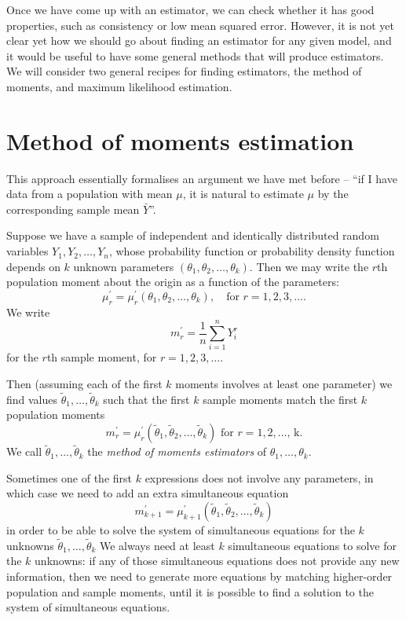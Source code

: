 \documentclass[]{book}
\theoremstyle{definition}
\theoremstyle{definition}
\theoremstyle{definition}
\theoremstyle{remark}
\begin{document}
Once we have come up with an estimator, we can check whether it has good
properties, such as consistency or low mean squared error. However, it
is not yet clear yet how we should go about finding an estimator for any
given model, and it would be useful to have some general methods that
will produce estimators. We will consider two general recipes for
finding estimators, the method of moments, and maximum likelihood
estimation.

\section{Method of moments
estimation}\label{method-of-moments-estimation}

This approach essentially formalises an argument we have met before --
``if I have data from a population with mean \(\mu\), it is natural to
estimate \(\mu\) by the corresponding sample mean \(\bar Y\)''.

Suppose we have a sample of independent and identically distributed
random variables \(Y_1, Y_2, \ldots,Y_n\), whose probability function or
probability density function depends on \(k\) unknown parameters
\((\theta_1, \theta_2, \ldots, \theta_k)\). Then we may write the
\(r\)th population moment about the origin as a function of the
parameters:
\[\mu_r^\prime = \mu_r^\prime(\theta_1, \theta_2, \ldots, \theta_k), \quad \text{for $r = 1, 2, 3, \ldots$.}\]
We write \[m_r^\prime = \frac{1}{n} \sum_{i=1}^n Y_i^r\] for the \(r\)th
sample moment, for \(r = 1, 2, 3, \ldots\).

Then (assuming each of the first \(k\) moments involves at least one
parameter) we find values \(\tilde \theta_1, \ldots, \tilde \theta_k\)
such that the first \(k\) sample moments match the first \(k\)
population moments
\[m_r^\prime = \mu_r^\prime(\tilde \theta_1, \tilde \theta_2, \ldots, \tilde \theta_k) \text{ for $r = 1, 2, \ldots$, k}.\]
We call \(\tilde \theta_1, \ldots, \tilde \theta_k\) the \emph{method of
moments estimators} of \(\theta_1, \ldots, \theta_k\).

Sometimes one of the first \(k\) expressions does not involve any
parameters, in which case we need to add an extra simultaneous equation
\[m_{k+1}^\prime = \mu_{k+1}^\prime(\tilde \theta_1, \tilde \theta_2, \ldots, \tilde \theta_k)\]
in order to be able to solve the system of simultaneous equations for
the \(k\) unknowns \(\tilde \theta_1, \ldots, \tilde \theta_k\) We
always need at least \(k\) simultaneous equations to solve for the \(k\)
unknowns: if any of those simultaneous equations does not provide any
new information, then we need to generate more equations by matching
higher-order population and sample moments, until it is possible to find
a solution to the system of simultaneous equations.
\end{document}
